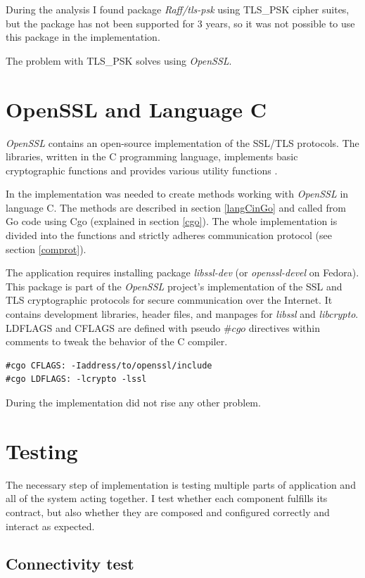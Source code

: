 \documentclass[
  oneside, 12pt, 
  printed, %
  notable,   %
  nolof,     %
  nolot,     %
]{fithesis3}
\begin{document}
During the analysis I found package \textit{Raff/tls-psk} using TLS\_PSK cipher suites, but the 
package has not been supported for 3 years, so it was not possible to use this package in the 
implementation. 

The problem with TLS\_PSK solves using \textit{OpenSSL}.

\section{OpenSSL and Language C}

\textit{OpenSSL} contains an open-source implementation of the SSL/TLS protocols. The libraries, 
written in the C programming language, implements basic cryptographic functions and provides 
various utility functions \cite{foundation}. 

In the implementation was needed to create methods working with \textit{OpenSSL} in language C. 
The methods are described in section \ref{langCinGo} and called from Go code using Cgo (explained 
in section \ref{cgo}). The whole implementation is divided into the functions and strictly adheres 
communication protocol (see section \ref{comprot}). 

The application requires installing package 
\textit{libssl-dev}  (or \textit{openssl-devel} on Fedora). This package is part of the 
\textit{OpenSSL} project's implementation of the SSL and TLS cryptographic protocols for secure 
communication over the Internet. It contains development libraries, header files, and manpages for 
\textit{libssl} and \textit{libcrypto}. LDFLAGS and CFLAGS are defined with pseudo $\#cgo$ 
directives within comments to tweak the behavior of the C compiler. 
\begin{lstlisting}
#cgo CFLAGS: -Iaddress/to/openssl/include
#cgo LDFLAGS: -lcrypto -lssl
\end{lstlisting}

During the implementation did not rise any other problem.

\section{Testing}

The necessary step of implementation is testing multiple parts of application and all of the 
system acting together. I test whether each component fulfills its contract, but also whether they 
are composed and configured correctly and interact as expected. 

\subsection{Connectivity test}
\end{document}
